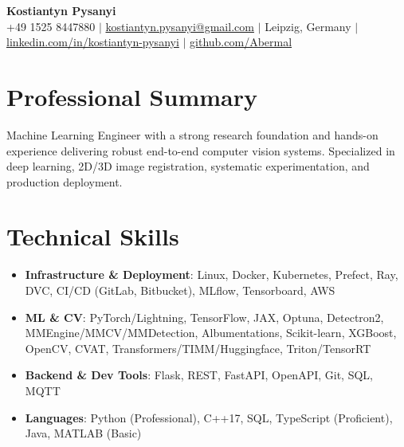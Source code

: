 \documentclass[letterpaper,10pt]{article}
\newcommand{\resumeItem}[1]{
    \item\small{#1}\vspace{-0.5pt}
}
\newcommand{\resumeSubHeadingList}{\begin{itemize}[leftmargin=0.15in, label={}]\vspace{-2pt}}
\newcommand{\resumeSubHeadingListEnd}{\end{itemize}}
\begin{document}
\begin{center}
  \textbf{\Huge Kostiantyn Pysanyi}\vspace{4pt} \\
  \small +49 1525 8447880 $|$ \href{mailto:kostiantyn.pysanyi@gmail.com}{kostiantyn.pysanyi@gmail.com} $|$ Leipzig, Germany $|$
  \href{https://www.linkedin.com/in/kostiantyn-pysanyi/}{linkedin.com/in/kostiantyn-pysanyi} $|$ \href{https://github.com/Abermal}{github.com/Abermal}
\end{center}


\section{Professional Summary}
Machine Learning Engineer with a strong research foundation and hands-on experience delivering robust end-to-end computer vision systems. Specialized in deep learning, 2D/3D image registration, systematic experimentation, and production deployment.

\section{Technical Skills}
\resumeSubHeadingList
  \resumeItem{\textbf{Infrastructure \& Deployment}: Linux, Docker, Kubernetes, Prefect, Ray, DVC, CI/CD (GitLab, Bitbucket), MLflow, Tensorboard, AWS}
  \resumeItem{\textbf{ML \& CV}: PyTorch/Lightning, TensorFlow, JAX, Optuna, Detectron2, MMEngine/MMCV/MMDetection, Albumentations, Scikit-learn, XGBoost, OpenCV, CVAT, Transformers/TIMM/Huggingface, Triton/TensorRT}
  \resumeItem{\textbf{Backend \& Dev Tools}: Flask, REST, FastAPI, OpenAPI, Git, SQL, MQTT}
  \resumeItem{\textbf{Languages}: Python (Professional), C++17, SQL, TypeScript (Proficient), Java, MATLAB (Basic)}
\resumeSubHeadingListEnd
\end{document}
